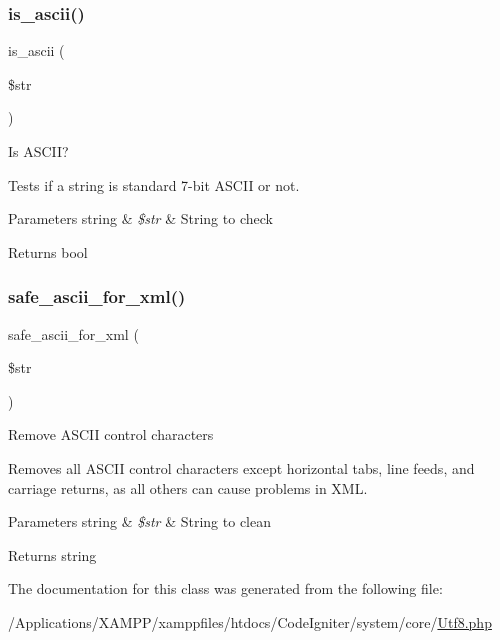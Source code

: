 \subsubsection{\texorpdfstring{is\+\_\+ascii()}{is\_ascii()}}
{\footnotesize\ttfamily is\+\_\+ascii (\begin{DoxyParamCaption}\item[{}]{\$str }\end{DoxyParamCaption})}

Is A\+S\+C\+II?

Tests if a string is standard 7-\/bit A\+S\+C\+II or not.


\begin{DoxyParams}[1]{Parameters}
string & {\em \$str} & String to check \\
\hline
\end{DoxyParams}
\begin{DoxyReturn}{Returns}
bool 
\end{DoxyReturn}
\mbox{\label{class_c_i___utf8_a10d712b507a87fd841f134143eaedb8e}} 
\subsubsection{\texorpdfstring{safe\+\_\+ascii\+\_\+for\+\_\+xml()}{safe\_ascii\_for\_xml()}}
{\footnotesize\ttfamily safe\+\_\+ascii\+\_\+for\+\_\+xml (\begin{DoxyParamCaption}\item[{}]{\$str }\end{DoxyParamCaption})}

Remove A\+S\+C\+II control characters

Removes all A\+S\+C\+II control characters except horizontal tabs, line feeds, and carriage returns, as all others can cause problems in X\+ML.


\begin{DoxyParams}[1]{Parameters}
string & {\em \$str} & String to clean \\
\hline
\end{DoxyParams}
\begin{DoxyReturn}{Returns}
string 
\end{DoxyReturn}


The documentation for this class was generated from the following file\+:\begin{DoxyCompactItemize}
\item 
/\+Applications/\+X\+A\+M\+P\+P/xamppfiles/htdocs/\+Code\+Igniter/system/core/\mbox{\hyperlink{_utf8_8php}{Utf8.\+php}}\end{DoxyCompactItemize}
